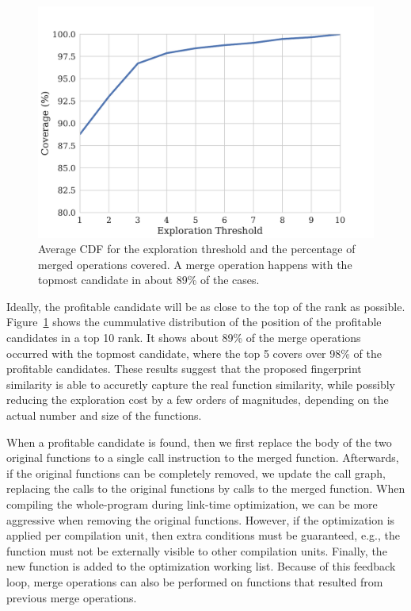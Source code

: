 \begin{figure}[h]
  \centering
  \includegraphics[width=\linewidth]{figs/average-cdf-exploration-threshold.pdf}
  \caption{Average CDF for the exploration threshold and the percentage of merged operations covered.
           A merge operation happens with the topmost candidate in about 89\% of the cases.}
  \label{fig:average-cdf-exploration-threshold}
\end{figure}

Ideally, the profitable candidate will be as close to the top of the rank as
possible.
Figure~\ref{fig:average-cdf-exploration-threshold} shows the cummulative
distribution of the position of the profitable candidates in a top 10 rank.
It shows about 89\% of the merge operations occurred with the topmost candidate,
where the top 5 covers over 98\% of the profitable candidates.
These results suggest that the proposed fingerprint similarity is able to
accuretly capture the real function similarity, while possibly reducing the
exploration cost by a few orders of magnitudes, depending on the actual number
and size of the functions.

When a profitable candidate is found, then we first replace the body of the two
original functions to a single call instruction to the merged function.
Afterwards, if the original functions can be completely removed, we update the
call graph, replacing the calls to the original functions by calls to the 
merged function.
When compiling the whole-program during link-time optimization, we can be more
aggressive when removing the original functions.
However, if the optimization is applied per compilation unit, then extra
conditions must be guaranteed, e.g., the function must not be externally visible
to other compilation units. 
Finally, the new function is added to the optimization working list.
Because of this feedback loop, merge operations can also be performed on
functions that resulted from previous merge operations.
 
